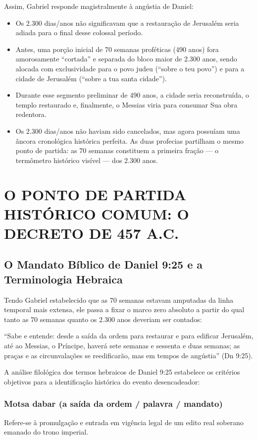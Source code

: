Assim, Gabriel responde magistralmente à angústia de Daniel:
\begin{itemize}
  \item Os 2.300 dias/anos não significavam que a restauração de Jerusalém seria adiada para o final desse colossal período.
  \item Antes, uma porção inicial de 70 semanas proféticas (490 anos) fora amorosamente ``cortada'' e separada do bloco maior de 2.300 anos, sendo alocada com exclusividade para o povo judeu (``sobre o teu povo'') e para a cidade de Jerusalém (``sobre a tua santa cidade'').
  \item Durante esse segmento preliminar de 490 anos, a cidade seria reconstruída, o templo restaurado e, finalmente, o Messias viria para consumar Sua obra redentora.
  \item Os 2.300 dias/anos não haviam sido cancelados, mas agora possuíam uma âncora cronológica histórica perfeita. As duas profecias partilham o mesmo ponto de partida: as 70 semanas constituem a primeira fração — o termômetro histórico visível — dos 2.300 anos.
\end{itemize}




\section{O PONTO DE PARTIDA HISTÓRICO COMUM: O DECRETO DE 457 A.C.}



\subsection{O Mandato Bíblico de Daniel 9:25 e a Terminologia Hebraica}


Tendo Gabriel estabelecido que as 70 semanas estavam amputadas da linha temporal mais extensa, ele passa a fixar o marco zero absoluto a partir do qual tanto as 70 semanas quanto os 2.300 anos deveriam ser contados:

``Sabe e entende: desde a saída da ordem para restaurar e para edificar Jerusalém, até ao Messias, o Príncipe, haverá sete semanas e sessenta e duas semanas; as praças e as circunvalações se reedificarão, mas em tempos de angústia'' (Dn 9:25).

A análise filológica dos termos hebraicos de Daniel 9:25 estabelece os critérios objetivos para a identificação histórica do evento desencadeador:

\subsubsection*{Motsa dabar (a saída da ordem / palavra / mandato)}
Refere-se à promulgação e entrada em vigência legal de um edito real soberano emanado do trono imperial.

